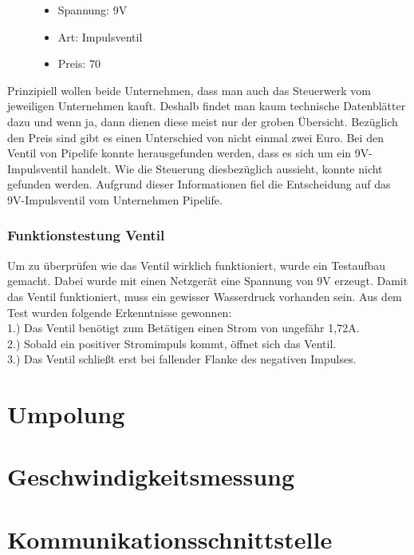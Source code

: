 \documentclass[12pt]{scrreprt} %
\begin{document}
\begin{figure}
\begin{minipage}[t]{0.45\textwidth}
\begin{itemize}
	\item{Spannung: 9V}
	\item{Art: Impulsventil}
	\item{Preis: 70\textsf{\texteuro}}
\end{itemize}

\end{minipage}
\end{figure} 
Prinzipiell wollen beide Unternehmen, dass man auch das Steuerwerk vom jeweiligen Unternehmen kauft. Deshalb findet man kaum technische Datenblätter dazu und wenn ja, dann dienen diese meist nur der groben Übersicht. Bezüglich den Preis sind gibt es einen Unterschied von nicht einmal zwei Euro. Bei den Ventil von Pipelife konnte herausgefunden werden, dass es sich um ein 9V-Impulsventil handelt. Wie die Steuerung diesbezüglich aussieht, konnte nicht gefunden werden. Aufgrund dieser Informationen fiel die Entscheidung auf das 9V-Impulsventil vom Unternehmen Pipelife.

\subsubsection{Funktionstestung Ventil}
\label{sec:funktionstestungVentil}

Um zu überprüfen wie das Ventil wirklich funktioniert, wurde ein Testaufbau gemacht. Dabei wurde mit einen Netzgerät eine Spannung von 9V erzeugt. Damit das Ventil funktioniert, muss ein gewisser Wasserdruck vorhanden sein. Aus dem Test wurden folgende Erkenntnisse gewonnen: \\

1.) Das Ventil benötigt zum Betätigen einen Strom von ungefähr 1,72A. \\

2.) Sobald ein positiver Stromimpuls kommt, öffnet sich das Ventil.\\

3.) Das Ventil schließt erst bei fallender Flanke des negativen Impulses.

\section{Umpolung} 
\newpage
\section{Geschwindigkeitsmessung}
\label{sec:geschwindigkeitsmessung}
\newpage
\section{Kommunikationsschnittstelle}
\label{sec:kommunikationsschnittstelle}
\newpage
\end{document}
